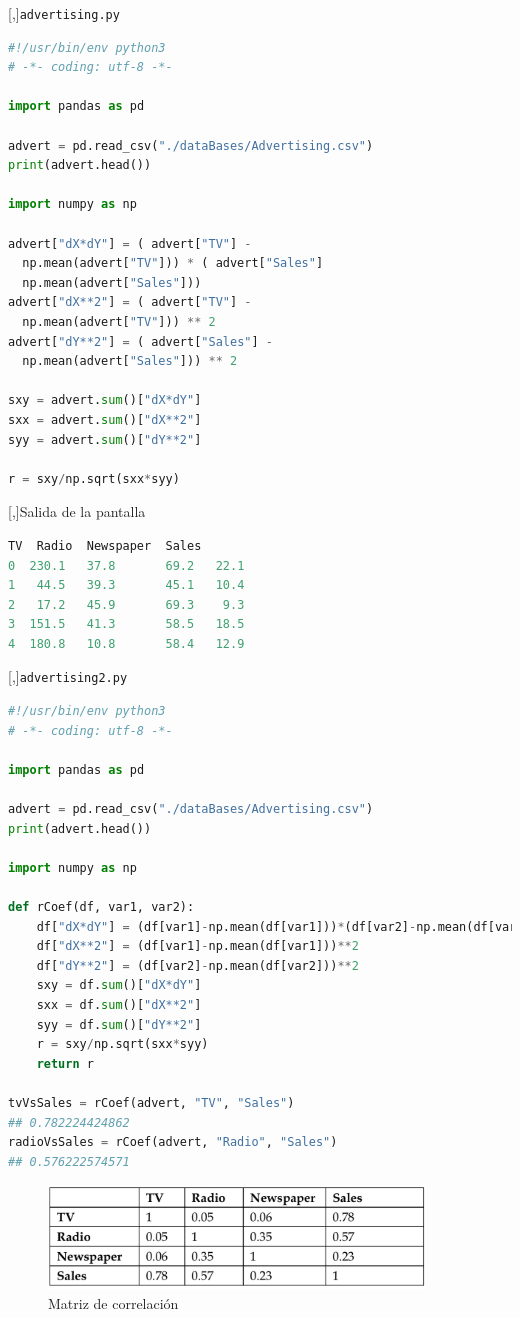 [,]{\texttt{advertising.py}}
\begin{lstlisting}[language=Python]
#!/usr/bin/env python3
# -*- coding: utf-8 -*-

import pandas as pd

advert = pd.read_csv("./dataBases/Advertising.csv")
print(advert.head())

import numpy as np

advert["dX*dY"] = ( advert["TV"] -
  np.mean(advert["TV"])) * ( advert["Sales"]
  np.mean(advert["Sales"]))
advert["dX**2"] = ( advert["TV"] -
  np.mean(advert["TV"])) ** 2
advert["dY**2"] = ( advert["Sales"] -
  np.mean(advert["Sales"])) ** 2

sxy = advert.sum()["dX*dY"]
sxx = advert.sum()["dX**2"]
syy = advert.sum()["dY**2"]

r = sxy/np.sqrt(sxx*syy)
\end{lstlisting}


[,]{Salida de la pantalla}
\begin{lstlisting}[language=Python]
      TV  Radio  Newspaper  Sales
0  230.1   37.8       69.2   22.1
1   44.5   39.3       45.1   10.4
2   17.2   45.9       69.3    9.3
3  151.5   41.3       58.5   18.5
4  180.8   10.8       58.4   12.9
\end{lstlisting}



[,]{\texttt{advertising2.py}}
\begin{lstlisting}[language=Python]
#!/usr/bin/env python3
# -*- coding: utf-8 -*-

import pandas as pd

advert = pd.read_csv("./dataBases/Advertising.csv")
print(advert.head())

import numpy as np

def rCoef(df, var1, var2):
    df["dX*dY"] = (df[var1]-np.mean(df[var1]))*(df[var2]-np.mean(df[var2]))
    df["dX**2"] = (df[var1]-np.mean(df[var1]))**2
    df["dY**2"] = (df[var2]-np.mean(df[var2]))**2
    sxy = df.sum()["dX*dY"]
    sxx = df.sum()["dX**2"]
    syy = df.sum()["dY**2"]
    r = sxy/np.sqrt(sxx*syy)
    return r

tvVsSales = rCoef(advert, "TV", "Sales")
## 0.782224424862
radioVsSales = rCoef(advert, "Radio", "Sales")
## 0.576222574571
\end{lstlisting}




\begin{figure}[h]
 \centering
 \includegraphics[width=10cm,keepaspectratio=true]{./images/correlationMatrix.png}
 \caption{Matriz de correlación}
 \label{correlationMatrix}
\end{figure}



